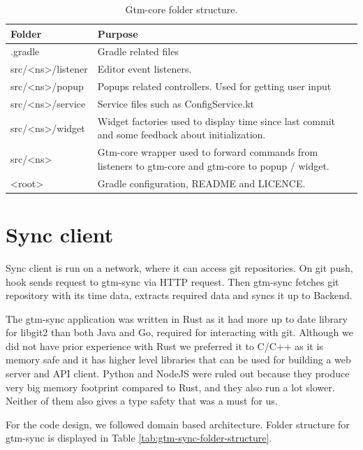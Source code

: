 \begin{table}[h]
    \centering
    \begin{tabular}{ | p{3cm} | p{10cm} |}
        \hline
        Folder & Purpose\\
        \hline
        .gradle & Gradle related files\\
        \hline
        src/<ns>/listener & Editor event listeners.\\
        \hline
        src/<ns>/popup & Popups related controllers.
        Used for getting user input\\
        \hline
        src/<ns>/service & Service files such as ConfigService.kt\\
        \hline
        src/<ns>/widget & Widget factories used to display time since last commit and some feedback about initialization.\\
        \hline
        src/<ns> & Gtm-core wrapper used to forward commands from listeners to gtm-core and gtm-core to popup / widget.\\
        \hline
        <root> & Gradle configuration, README and LICENCE.\\
        \hline
    \end{tabular}
    \caption{Gtm-core folder structure.}
    \label{tab:gtm-jetbrains-folder-structure}
\end{table}

\section{Sync client}\label{sec:sync-client}
Sync client is run on a network, where it can access git repositories.
On git push, hook sends request to gtm-sync via HTTP request.
Then gtm-sync fetches git repository with its time data, extracts required data and syncs it up to Backend.

The gtm-sync application was written in Rust as it had more up to date library for libgit2 than both Java and Go, required for interacting with git.
Although we did not have prior experience with Rust we preferred it to C/C++ as it is memory safe and it has higher level libraries that can be
used for building a web server and API client.
Python and NodeJS were ruled out because they produce very big memory footprint compared to Rust, and they also run a lot slower.
Neither of them also gives a type safety that was a must for us.

For the code design, we followed domain based architecture.
Folder structure for gtm-sync is displayed in Table
\ref{tab:gtm-sync-folder-structure}.

